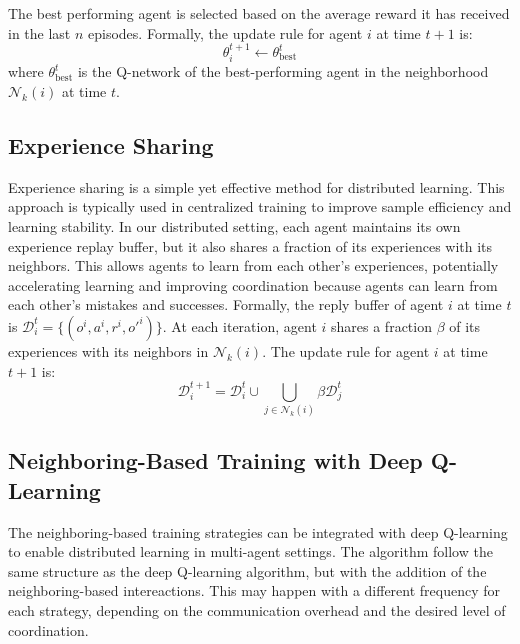 \documentclass[sigconf]{acmart}
\begin{document}
The best performing agent is selected based on the average reward it has received in the last $n$ episodes.
Formally, the update rule for agent $i$ at time $t+1$ is:
\begin{equation}
  \theta^{t+1}_i \leftarrow \theta^t_{\text{best}}
\end{equation}
where $\theta^t_{\text{best}}$ is the Q-network of the best-performing agent in the neighborhood $\mathcal{N}_k(i)$ at time $t$.

\subsection{Experience Sharing}
Experience sharing is a simple yet effective method for distributed learning.
This approach is typically used in centralized training to improve sample efficiency and learning stability.
In our distributed setting, each agent maintains its own experience replay buffer, but it also shares a fraction of its experiences with its neighbors.
This allows agents to learn from each other's experiences, potentially accelerating learning and improving coordination because agents can learn from each other's mistakes and successes.
%
Formally, the reply buffer of agent $i$ at time $t$ is $\mathcal{D}^t_i = \{(o^i, a^i, r^i, o'^i)\}$.
At each iteration, agent $i$ shares a fraction $\beta$ of its experiences with its neighbors in $\mathcal{N}_k(i)$.
The update rule for agent $i$ at time $t+1$ is:
\begin{equation}
  \mathcal{D}^{t+1}_i = \mathcal{D}^t_i \cup \bigcup_{j \in \mathcal{N}_k(i)} \beta \mathcal{D}^t_j
\end{equation}
\subsection{Neighboring-Based Training with Deep Q-Learning}
The neighboring-based training strategies can be integrated with deep Q-learning to enable distributed learning in multi-agent settings.
%
The algorithm follow the same structure as the deep Q-learning algorithm, but with the addition of the neighboring-based intereactions.
%
This may happen with a different frequency for each strategy, depending on the communication overhead and the desired level of coordination.
\end{document}
